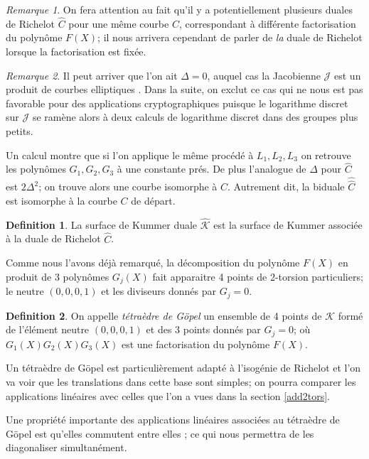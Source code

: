\documentclass[a4paper]{article}
\theoremstyle{definition}
\newtheorem{definition}{Definition}[section]
\theoremstyle{remark}
\newtheorem{remarque}{Remarque}
\numberwithin{equation}{section}
\begin{document}
\begin{remarque}
On fera attention au fait qu'il y a potentiellement plusieurs duales de Richelot $\hat{C}$ pour une même courbe $C$, correspondant à différente factorisation du polynôme $F(X)$; il nous arrivera cependant de parler de \emph{la} duale de Richelot lorsque la factorisation est fixée.
\end{remarque}

\begin{remarque}
Il peut arriver que l'on ait $\Delta = 0$, auquel cas la Jacobienne $\mathcal{J}$ est un produit de courbes elliptiques \citep{cassels-Flynn}. Dans la suite, on exclut ce cas qui ne nous est pas favorable pour des applications cryptographiques puisque le logarithme discret sur $\mathcal{J}$ se ramène alors à deux calculs de logarithme discret dans des groupes plus petits.
\end{remarque}

Un calcul montre que si l'on applique le même procédé à $L_1,L_2,L_3$ on retrouve les polynômes $G_1,G_2,G_3$ à une constante prés. De plus l'analogue de $\Delta$ pour $\hat{C}$ est $2\Delta^2$; on trouve alors une courbe isomorphe à $C$. Autrement dit, la biduale $\hat{\hat{C}}$ est isomorphe à la courbe $C$ de départ.

\begin{definition}
La surface de Kummer duale $\hat{\mathcal{K}}$ est la surface de Kummer associée à la duale de Richelot $\hat{C}$.
\end{definition}

Comme nous l'avons déjà remarqué, la décomposition du polynôme $F(X)$ en produit de 3 polynômes $G_j(X)$ fait apparaitre 4 points de 2-torsion particuliers; le neutre $(0,0,0,1)$ et les diviseurs donnés par $G_j=0$.

\begin{definition}
On appelle \emph{tétraèdre de G\"opel} un ensemble de 4 points de $\mathcal{K}$ formé de l'élément neutre $(0,0,0,1)$ et des 3 points donnés par $G_j=0$; où $G_1(X)G_2(X)G_3(X)$ est une factorisation du polynôme $F(X)$.
\end{definition}

Un tétraèdre de G\"opel est particulièrement adapté à l'isogénie de Richelot et l'on va voir que les translations dans cette base sont simples; on pourra comparer les applications linéaires avec celles que l'on a vues dans la section \ref{add2tors}.

Une propriété importante des applications linéaires associées au tétraèdre de G\"opel est qu'elles commutent entre elles \citep{cassels-Flynn}; ce qui nous permettra de les diagonaliser simultanément. 
\end{document}
